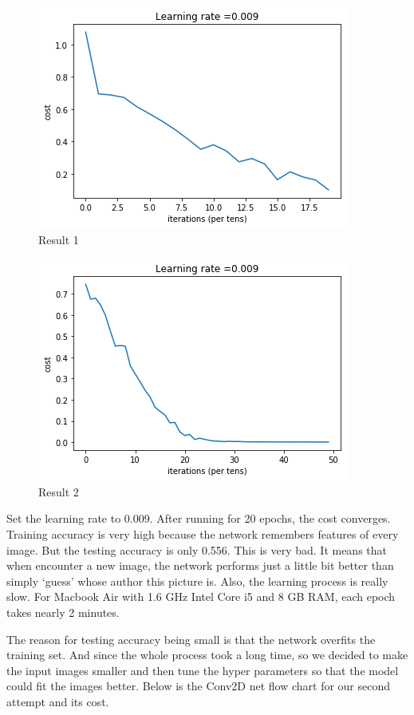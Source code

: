 \documentclass{article}
\begin{document}
\begin{figure}[ht]
  \centering
  \includegraphics[width=0.6\linewidth]{cnn_structrue_1_result.png}
  \caption{Result 1}
  \label{words segmentation1}
\end{figure}

\begin{figure}[ht]
  \centering
  \includegraphics[width=0.6\linewidth]{cnn_structrue_2_result.png}
  \caption{Result 2}
  \label{words segmentation1}
\end{figure}

Set the learning rate to 0.009. After running for 20 epochs, the cost converges. Training accuracy is very high because the network remembers features of every image. But the testing accuracy is only 0.556. This is very bad. It means that when encounter a new image, the network performs just a little bit better than simply ‘guess’ whose author this picture is. Also, the learning process is really slow. For Macbook Air with 1.6 GHz Intel Core i5 and 8 GB RAM, each epoch takes nearly 2 minutes. 

The reason for testing accuracy being small is that the network overfits the training set. And since the whole process took a long time, so we decided to make the input images smaller and then tune the hyper parameters so that the model could fit the images better. Below is the Conv2D net flow chart for our second attempt and its cost.
\end{document}
